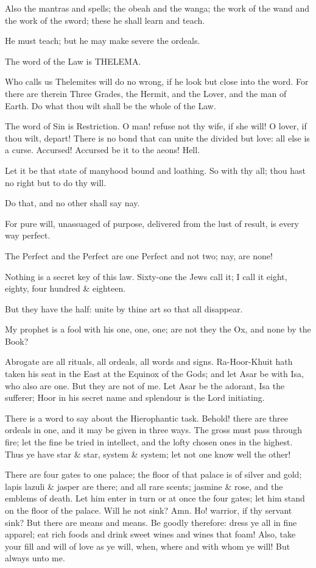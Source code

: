 Also the mantras and spells; the obeah and the wanga; the work of the wand and the work of the sword; these he shall learn and teach.

He must teach; but he may make severe the ordeals.

The word of the Law is THELEMA.

Who calls us Thelemites will do no wrong, if he look but close into the word. For there are therein Three Grades, the Hermit, and the Lover, and the man of Earth. Do what thou wilt shall be the whole of the Law.

The word of Sin is Restriction. O man! refuse not thy wife, if she will! O lover, if thou wilt, depart! There is no bond that can unite the divided but love: all else is a curse. Accursed! Accursed be it to the aeons! Hell.

Let it be that state of manyhood bound and loathing. So with thy all; thou hast no right but to do thy will.

Do that, and no other shall say nay.

For pure will, unassuaged of purpose, delivered from the lust of result, is every way perfect.

The Perfect and the Perfect are one Perfect and not two; nay, are none!

Nothing is a secret key of this law. Sixty-one the Jews call it; I call it eight, eighty, four hundred & eighteen.

But they have the half: unite by thine art so that all disappear.

My prophet is a fool with his one, one, one; are not they the Ox, and none by the Book?

Abrogate are all rituals, all ordeals, all words and signs. Ra-Hoor-Khuit hath taken his seat in the East at the Equinox of the Gods; and let Asar be with Isa, who also are one. But they are not of me. Let Asar be the adorant, Isa the sufferer; Hoor in his secret name and splendour is the Lord initiating.

There is a word to say about the Hierophantic task. Behold! there are three ordeals in one, and it may be given in three ways. The gross must pass through fire; let the fine be tried in intellect, and the lofty chosen ones in the highest. Thus ye have star & star, system & system; let not one know well the other!

There are four gates to one palace; the floor of that palace is of silver and gold; lapis lazuli & jasper are there; and all rare scents; jasmine & rose, and the emblems of death. Let him enter in turn or at once the four gates; let him stand on the floor of the palace. Will he not sink? Amn. Ho! warrior, if thy servant sink? But there are means and means. Be goodly therefore: dress ye all in fine apparel; eat rich foods and drink sweet wines and wines that foam! Also, take your fill and will of love as ye will, when, where and with whom ye will! But always unto me.

